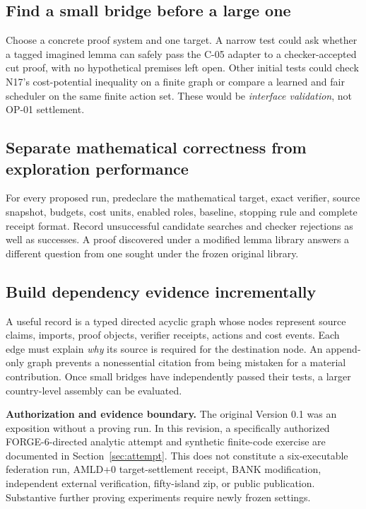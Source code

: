 \documentclass[11pt,letterpaper,oneside]{article}
\begin{document}
\subsection{Find a small bridge before a large one}
Choose a concrete proof system and one target. A narrow test could ask whether a tagged imagined lemma can safely pass the C-05 adapter to a checker-accepted cut proof, with no hypothetical premises left open. Other initial tests could check N17's cost-potential inequality on a finite graph or compare a learned and fair scheduler on the same finite action set. These would be \emph{interface validation}, not OP-01 settlement.

\subsection{Separate mathematical correctness from exploration performance}
For every proposed run, predeclare the mathematical target, exact verifier, source snapshot, budgets, cost units, enabled roles, baseline, stopping rule and complete receipt format. Record unsuccessful candidate searches and checker rejections as well as successes. A proof discovered under a modified lemma library answers a different question from one sought under the frozen original library.

\subsection{Build dependency evidence incrementally}
A useful record is a typed directed acyclic graph whose nodes represent source claims, imports, proof objects, verifier receipts, actions and cost events. Each edge must explain \emph{why} its source is required for the destination node. An append-only graph prevents a nonessential citation from being mistaken for a material contribution. Once small bridges have independently passed their tests, a larger country-level assembly can be evaluated.

\begin{caution}
\textbf{Authorization and evidence boundary.} The original Version 0.1 was an exposition without a proving run. In this revision, a specifically authorized FORGE-6-directed analytic attempt and synthetic finite-code exercise are documented in Section~\ref{sec:attempt}. This does not constitute a six-executable federation run, AMLD+0 target-settlement receipt, BANK modification, independent external verification, fifty-island zip, or public publication. Substantive further proving experiments require newly frozen settings.
\end{caution}
\end{document}

